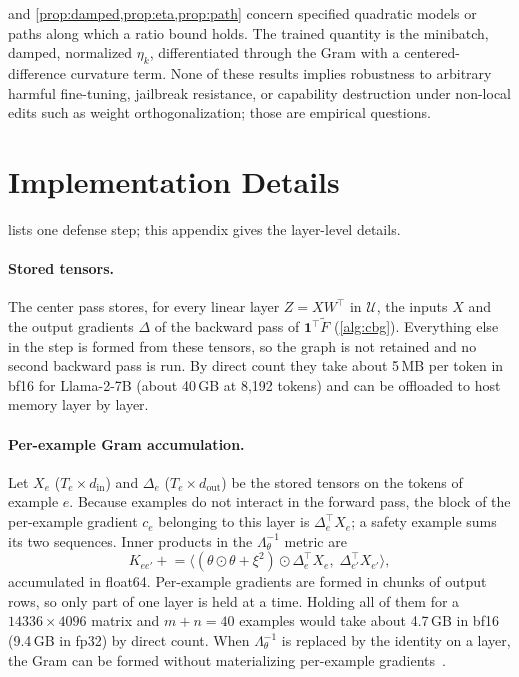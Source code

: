 \documentclass[11pt]{article}
\newcommand{\U}{\mathcal{U}}
\newcommand{\Lam}{\Lambda_{\theta}}
\newcommand{\Ft}{\widetilde{F}}
\newcommand{\etak}{\eta_{k}}
\begin{document}
 and \cref{prop:damped,prop:eta,prop:path} concern specified quadratic models or paths along which a ratio bound holds. The trained quantity is the minibatch, damped, normalized $\etak$, differentiated through the Gram with a centered-difference curvature term. None of these results implies robustness to arbitrary harmful fine-tuning, jailbreak resistance, or capability destruction under non-local edits such as weight orthogonalization; those are empirical questions.

\section{Implementation Details}
\label{app:impl}

 lists one defense step; this appendix gives the layer-level details.

\paragraph{Stored tensors.}
The center pass stores, for every linear layer $Z=XW^\top$ in $\U$, the inputs $X$ and the output gradients $\Delta$ of the backward pass of $\mathbf 1^\top\Ft$ (\cref{alg:cbg}). Everything else in the step is formed from these tensors, so the graph is not retained and no second backward pass is run. By direct count they take about 5\,MB per token in bf16 for Llama-2-7B (about 40\,GB at 8{,}192 tokens) and can be offloaded to host memory layer by layer.

\paragraph{Per-example Gram accumulation.}
Let $X_e$ ($T_e\times d_{\mathrm{in}}$) and $\Delta_e$ ($T_e\times d_{\mathrm{out}}$) be the stored tensors on the tokens of example $e$. Because examples do not interact in the forward pass, the block of the per-example gradient $c_e$ belonging to this layer is $\Delta_e^\top X_e$; a safety example sums its two sequences. Inner products in the $\Lam^{-1}$ metric are
\begin{equation*}
K_{ee'}\mathrel{+}=\bigl\langle(\theta\odot\theta+\xi^2)\odot\Delta_e^\top X_e,\;\Delta_{e'}^\top X_{e'}\bigr\rangle ,
\end{equation*}
accumulated in float64. Per-example gradients are formed in chunks of output rows, so only part of one layer is held at a time. Holding all of them for a $14336\times4096$ matrix and $m+n=40$ examples would take about 4.7\,GB in bf16 (9.4\,GB in fp32) by direct count. When $\Lam^{-1}$ is replaced by the identity on a layer, the Gram can be formed without materializing per-example gradients~\citep{li2022large}.
\end{document}
